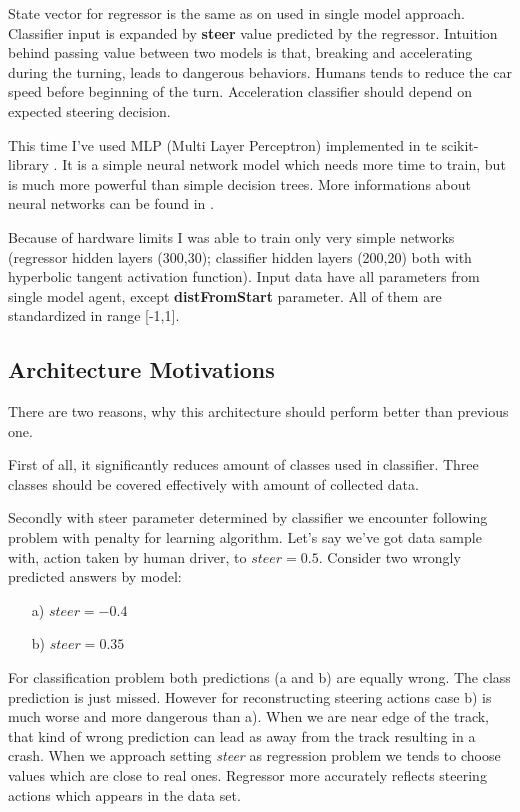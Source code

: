 \documentclass[declaration,shortabstract,english,inz]{iithesis}
\begin{document}
State vector for regressor is the same as on used in single model approach.
Classifier input is expanded by \textbf{steer} value predicted by the regressor.
Intuition behind passing value between two models is that, breaking and accelerating during the turning, leads to dangerous behaviors.
Humans tends to reduce the car speed before beginning of the turn.
Acceleration classifier should depend on expected steering decision.


This time I've used MLP (Multi Layer Perceptron) implemented in te scikit-library \cite{scikit_learn}.
It is a simple neural network model which needs more time to train, but is much more powerful than simple decision trees. More informations about neural networks can be found in \cite{neuraln_nets}.


Because of hardware limits I was able to train only very simple networks (regressor hidden layers (300,30); classifier hidden layers (200,20) both with hyperbolic tangent activation function).
Input data have all parameters from single model agent, except \textbf{distFromStart} parameter.
All of them are standardized in range [-1,1].

\subsection{Architecture Motivations}

There are two reasons, why this architecture should perform better than previous one.

First of all, it significantly reduces amount of classes used in classifier.
Three classes should be covered effectively with amount of collected data.

Secondly with steer parameter determined by classifier we encounter following problem with penalty for learning algorithm.
Let's say we've got data sample with, action taken by human driver, to $steer=0.5$.
Consider two wrongly predicted answers by model:
\begin{itemize}
    \item[a)] $steer=-0.4$
    \item[b)] $steer=0.35$
\end{itemize}

For classification problem both predictions (a and b) are equally wrong.
 The class prediction is just missed.
However for reconstructing steering actions case b) is much worse and more dangerous than a).
When we are near edge of the track, that kind of wrong prediction can lead as away from the track resulting in a crash.
When we approach setting \textit{steer} as regression problem we tends to choose values which are close to real ones.
Regressor more accurately reflects steering actions which appears in the data set.
\end{document}
